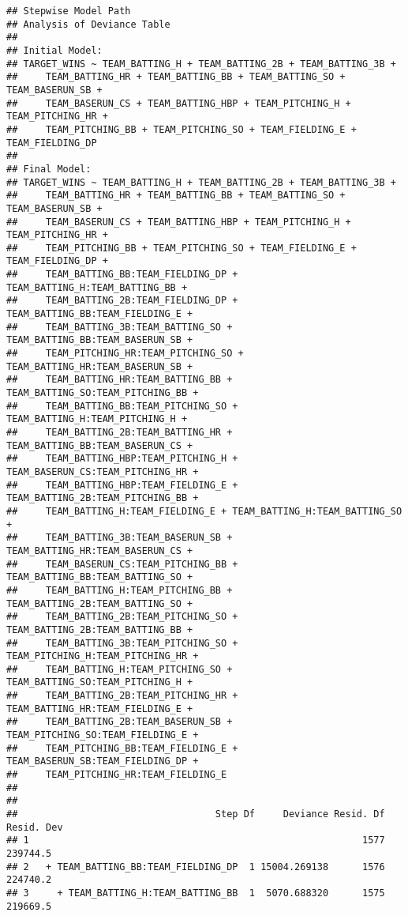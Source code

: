 \documentclass[
]{article}
\begin{document}
\begin{verbatim}
## Stepwise Model Path 
## Analysis of Deviance Table
## 
## Initial Model:
## TARGET_WINS ~ TEAM_BATTING_H + TEAM_BATTING_2B + TEAM_BATTING_3B + 
##     TEAM_BATTING_HR + TEAM_BATTING_BB + TEAM_BATTING_SO + TEAM_BASERUN_SB + 
##     TEAM_BASERUN_CS + TEAM_BATTING_HBP + TEAM_PITCHING_H + TEAM_PITCHING_HR + 
##     TEAM_PITCHING_BB + TEAM_PITCHING_SO + TEAM_FIELDING_E + TEAM_FIELDING_DP
## 
## Final Model:
## TARGET_WINS ~ TEAM_BATTING_H + TEAM_BATTING_2B + TEAM_BATTING_3B + 
##     TEAM_BATTING_HR + TEAM_BATTING_BB + TEAM_BATTING_SO + TEAM_BASERUN_SB + 
##     TEAM_BASERUN_CS + TEAM_BATTING_HBP + TEAM_PITCHING_H + TEAM_PITCHING_HR + 
##     TEAM_PITCHING_BB + TEAM_PITCHING_SO + TEAM_FIELDING_E + TEAM_FIELDING_DP + 
##     TEAM_BATTING_BB:TEAM_FIELDING_DP + TEAM_BATTING_H:TEAM_BATTING_BB + 
##     TEAM_BATTING_2B:TEAM_FIELDING_DP + TEAM_BATTING_BB:TEAM_FIELDING_E + 
##     TEAM_BATTING_3B:TEAM_BATTING_SO + TEAM_BATTING_BB:TEAM_BASERUN_SB + 
##     TEAM_PITCHING_HR:TEAM_PITCHING_SO + TEAM_BATTING_HR:TEAM_BASERUN_SB + 
##     TEAM_BATTING_HR:TEAM_BATTING_BB + TEAM_BATTING_SO:TEAM_PITCHING_BB + 
##     TEAM_BATTING_BB:TEAM_PITCHING_SO + TEAM_BATTING_H:TEAM_PITCHING_H + 
##     TEAM_BATTING_2B:TEAM_BATTING_HR + TEAM_BATTING_BB:TEAM_BASERUN_CS + 
##     TEAM_BATTING_HBP:TEAM_PITCHING_H + TEAM_BASERUN_CS:TEAM_PITCHING_HR + 
##     TEAM_BATTING_HBP:TEAM_FIELDING_E + TEAM_BATTING_2B:TEAM_PITCHING_BB + 
##     TEAM_BATTING_H:TEAM_FIELDING_E + TEAM_BATTING_H:TEAM_BATTING_SO + 
##     TEAM_BATTING_3B:TEAM_BASERUN_SB + TEAM_BATTING_HR:TEAM_BASERUN_CS + 
##     TEAM_BASERUN_CS:TEAM_PITCHING_BB + TEAM_BATTING_BB:TEAM_BATTING_SO + 
##     TEAM_BATTING_H:TEAM_PITCHING_BB + TEAM_BATTING_2B:TEAM_BATTING_SO + 
##     TEAM_BATTING_2B:TEAM_PITCHING_SO + TEAM_BATTING_2B:TEAM_BATTING_BB + 
##     TEAM_BATTING_3B:TEAM_PITCHING_SO + TEAM_PITCHING_H:TEAM_PITCHING_HR + 
##     TEAM_BATTING_H:TEAM_PITCHING_SO + TEAM_BATTING_SO:TEAM_PITCHING_H + 
##     TEAM_BATTING_2B:TEAM_PITCHING_HR + TEAM_BATTING_HR:TEAM_FIELDING_E + 
##     TEAM_BATTING_2B:TEAM_BASERUN_SB + TEAM_PITCHING_SO:TEAM_FIELDING_E + 
##     TEAM_PITCHING_BB:TEAM_FIELDING_E + TEAM_BASERUN_SB:TEAM_FIELDING_DP + 
##     TEAM_PITCHING_HR:TEAM_FIELDING_E
## 
## 
##                                   Step Df     Deviance Resid. Df Resid. Dev
## 1                                                           1577   239744.5
## 2   + TEAM_BATTING_BB:TEAM_FIELDING_DP  1 15004.269138      1576   224740.2
## 3     + TEAM_BATTING_H:TEAM_BATTING_BB  1  5070.688320      1575   219669.5

\end{verbatim}
\end{document}
